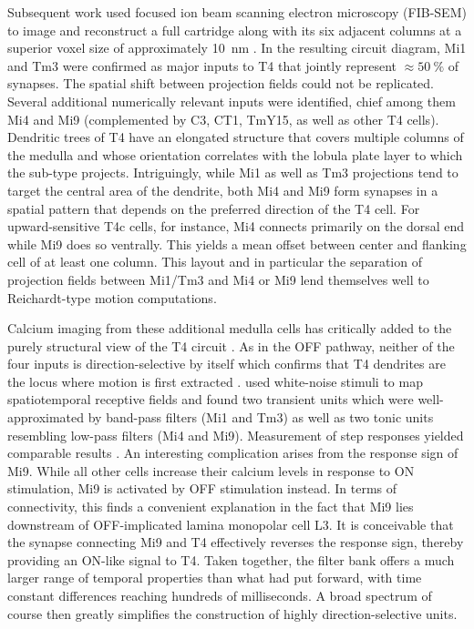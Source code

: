 Subsequent work used focused ion beam scanning electron microscopy (FIB-SEM) to image and reconstruct a full cartridge along with its six adjacent columns at a superior voxel size of approximately \SI{10}{\nano\meter} \citep{Takemura:2017aa}. In the resulting circuit diagram, Mi1 and Tm3 were confirmed as major inputs to T4 that jointly represent $\approx\SI{50}{\percent}$ of synapses. The spatial shift between projection fields could not be replicated. Several additional numerically relevant inputs were identified, chief among them Mi4 and Mi9 (complemented by C3, CT1, TmY15, as well as other T4 cells). Dendritic trees of T4 have an elongated structure that covers multiple columns of the medulla and whose orientation correlates with the lobula plate layer to which the sub-type projects. Intriguingly, while Mi1 as well as Tm3 projections tend to target the central area of the dendrite, both Mi4 and Mi9 form synapses in a spatial pattern that depends on the preferred direction of the T4 cell. For upward-sensitive T4c cells, for instance, Mi4 connects primarily on the dorsal end while Mi9 does so ventrally. This yields a mean offset between center and flanking cell of at least one column. This layout and in particular the separation of projection fields between Mi1/Tm3 and Mi4 or Mi9 lend themselves well to Reichardt-type motion computations.

Calcium imaging from these additional medulla cells has critically added to the purely structural view of the T4 circuit \citep{Strother:2014aa,Arenz:2017aa,Strother:2017aa}. As in the OFF pathway, neither of the four inputs is direction-selective by itself which confirms that T4 dendrites are the locus where motion is first extracted \citep{Strother:2017aa}. \citet{Arenz:2017aa} used white-noise stimuli to map spatiotemporal receptive fields and found two transient units which were well-approximated by band-pass filters (Mi1 and Tm3) as well as two tonic units resembling low-pass filters (Mi4 and Mi9). Measurement of step responses yielded comparable results \citep{Strother:2017aa}. An interesting complication arises from the response sign of Mi9. While all other cells increase their calcium levels in response to ON stimulation, Mi9 is activated by OFF stimulation instead. In terms of connectivity, this finds a convenient explanation in the fact that Mi9 lies downstream of OFF-implicated lamina monopolar cell L3. It is conceivable that the synapse connecting Mi9 and T4 effectively reverses the response sign, thereby providing an ON-like signal to T4. Taken together, the filter bank offers a much larger range of temporal properties than what \citet{Behnia:2014jh} had put forward, with time constant differences reaching hundreds of milliseconds. A broad spectrum of course then greatly simplifies the construction of highly direction-selective units.

